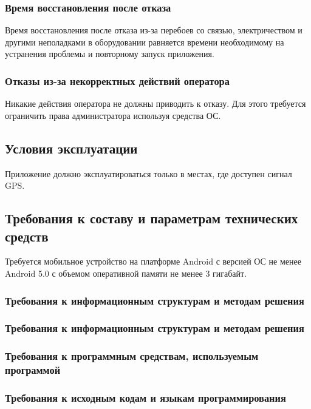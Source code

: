     \subsubsection{Время восстановления после отказа}
Время восстановления после отказа из-за перебоев со связью, электричеством и другими неполадками в оборудовании равняется времени необходимому на устранения проблемы и повторному запуск приложения.

    \subsubsection{Отказы из-за некорректных действий оператора}
Никакие действия оператора не должны приводить к отказу. Для этого требуется ограничить права администратора используя средства ОС.

\subsection{Условия эксплуатации}
Приложение должно эксплуатироваться только в местах, где доступен сигнал GPS.

\subsection{Требования к составу и параметрам технических средств}
Требуется мобильное устройство на платформе Android с версией ОС не менее Android 5.0 с объемом оперативной памяти не менее 3 гигабайт.

\subsubsection{Требования к информационным структурам и методам решения}
    \subsubsection{Требования к информационным структурам и методам решения}

    \subsubsection{Требования к программным средствам, используемым программой}
    
    \subsubsection{Требования к исходным кодам и языкам программирования}

